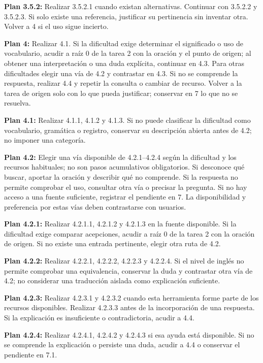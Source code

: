 \documentclass[10pt,a4paper]{article}
\begin{document}
\textbf{Plan 3.5.2:} Realizar 3.5.2.1 cuando existan alternativas. Continuar con 3.5.2.2 y 3.5.2.3. Si solo existe una referencia, justificar su pertinencia sin inventar otra. Volver a 4 si el uso sigue incierto.\par
\textbf{Plan 4:} Realizar 4.1. Si la dificultad exige determinar el significado o uso de vocabulario, acudir a raíz 0 de la tarea 2 con la oración y el punto de origen; al obtener una interpretación o una duda explícita, continuar en 4.3. Para otras dificultades elegir una vía de 4.2 y contrastar en 4.3. Si no se comprende la respuesta, realizar 4.4 y repetir la consulta o cambiar de recurso. Volver a la tarea de origen solo con lo que pueda justificar; conservar en 7 lo que no se resuelva.\par
\textbf{Plan 4.1:} Realizar 4.1.1, 4.1.2 y 4.1.3. Si no puede clasificar la dificultad como vocabulario, gramática o registro, conservar su descripción abierta antes de 4.2; no imponer una categoría.\par
\textbf{Plan 4.2:} Elegir una vía disponible de 4.2.1--4.2.4 según la dificultad y los recursos habituales; no son pasos acumulativos obligatorios. Si desconoce qué buscar, aportar la oración y describir qué no comprende. Si la respuesta no permite comprobar el uso, consultar otra vía o precisar la pregunta. Si no hay acceso a una fuente suficiente, registrar el pendiente en 7. La disponibilidad y preferencia por estas vías deben contrastarse con usuarios.\par
\textbf{Plan 4.2.1:} Realizar 4.2.1.1, 4.2.1.2 y 4.2.1.3 en la fuente disponible. Si la dificultad exige comparar acepciones, acudir a raíz 0 de la tarea 2 con la oración de origen. Si no existe una entrada pertinente, elegir otra ruta de 4.2.\par
\textbf{Plan 4.2.2:} Realizar 4.2.2.1, 4.2.2.2, 4.2.2.3 y 4.2.2.4. Si el nivel de inglés no permite comprobar una equivalencia, conservar la duda y contrastar otra vía de 4.2; no considerar una traducción aislada como explicación suficiente.\par
\textbf{Plan 4.2.3:} Realizar 4.2.3.1 y 4.2.3.2 cuando esta herramienta forme parte de los recursos disponibles. Realizar 4.2.3.3 antes de la incorporación de una respuesta. Si la explicación es insuficiente o contradictoria, acudir a 4.4.\par
\textbf{Plan 4.2.4:} Realizar 4.2.4.1, 4.2.4.2 y 4.2.4.3 si esa ayuda está disponible. Si no se comprende la explicación o persiste una duda, acudir a 4.4 o conservar el pendiente en 7.1.\par
\end{document}
